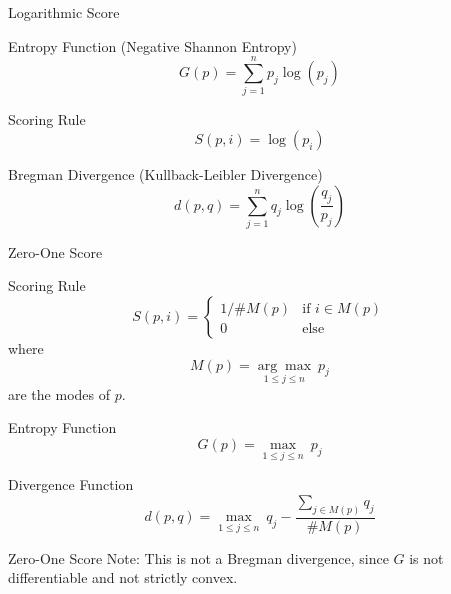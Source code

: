 \documentclass[aspectratio=43,10pt]{beamer}
\begin{document}
\begin{frame}{Logarithmic Score}
    \begin{exampleblock}{Entropy Function (Negative Shannon Entropy)}
        $$G(p) = \sum_{j=1}^n p_j\log(p_j)$$
    \end{exampleblock}
    \begin{exampleblock}{Scoring Rule}
        $$S(p, i) = \log(p_i)$$
    \end{exampleblock}
    \pause
    \begin{exampleblock}{Bregman Divergence (Kullback-Leibler Divergence)}
        $$d(p, q) = \sum_{j=1}^n q_j\log\left(\frac{q_j}{p_j}\right)$$
    \end{exampleblock}
\end{frame}
\begin{frame}{Zero-One Score}
    \begin{exampleblock}{Scoring Rule}
        $$S(p,i) = \begin{cases}
            1/\#M(p) & \text{if } i\in M(p) \\
            0 & \text{else}
        \end{cases}$$ where $$M(p) = \underset{1\leq j\leq n}{\arg\max}\ p_j$$ are the modes of $p$.
    \end{exampleblock}
    \begin{exampleblock}{Entropy Function}
        $$G(p) = \underset{1\leq j\leq n}{\max}\ p_j$$
    \end{exampleblock}
    \pause
    \begin{exampleblock}{Divergence Function}
        $$d(p, q) = \underset{1\leq j\leq n}{\max}\ q_j -\frac{\sum_{j\in M(p)}q_j}{\#M(p)}$$
    \end{exampleblock}
\end{frame}
\begin{frame}{Zero-One Score}
    Note: This is not a Bregman divergence, since $G$ is not differentiable and not strictly convex.
\end{frame}
\end{document}

